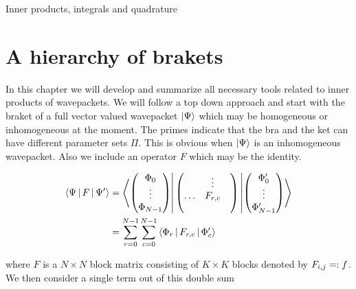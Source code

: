 \begin{chapter}{Inner products, integrals and quadrature}
\label{ch:quadrature}

\section{A hierarchy of brakets}

In this chapter we will develop and summarize all necessary tools related to
inner products of wavepackets. We will follow a top down approach and start with
the braket of a full vector valued wavepacket $\Ket{\Psi}$ which may be homogeneous
or inhomogeneous at the moment. The primes indicate that the bra and the ket can
have different parameter sets $\Pi$. This is obvious when $\Ket{\Psi}$ is an
inhomogeneous wavepacket. Also we include an operator $F$ which may be the identity.

\begin{equation}
\begin{split}
  \Braket{\Psi | F | \Psi^\prime} & =
    \Bra{
    \begin{pmatrix}
    \Phi_0     \\
    \vdots     \\
    \Phi_{N-1}
    \end{pmatrix}
    }
    \begin{pmatrix}
    {}     & \vdots  & {} \\
    \hdots & F_{r,c} & {} \\
    {}     &         & {}
    \end{pmatrix}
    \Ket{
    \begin{pmatrix}
    \Phi_0^\prime     \\
    \vdots     \\
    \Phi_{N-1}^\prime
    \end{pmatrix}
    } \\
  & = \sum_{r=0}^{N-1} \sum_{c=0}^{N-1} \Braket{\Phi_r | F_{r,c} | \Phi_c^\prime}
\end{split}
\end{equation}

where $F$ is a $N \times N$ block matrix consisting of $K \times K$ blocks
denoted by $F_{i,j} =: f$. We then consider a single term out of this
double sum


\end{chapter}
